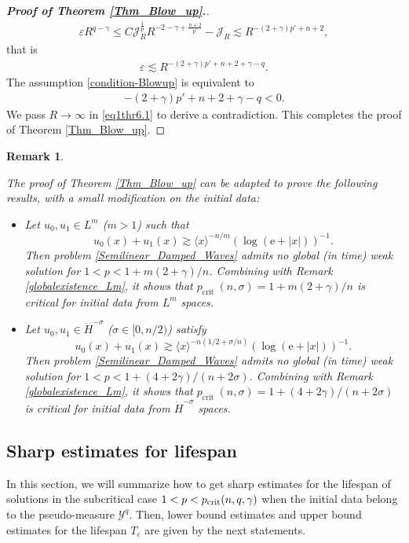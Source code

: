\documentclass[11pt,reqno]{amsart}
\newtheorem{remark}{Remark}[section]
\begin{document}
\begin{proof}[\textbf{Proof of Theorem \ref{Thm_Blow_up}.}]
\begin{align*}
\varepsilon R^{q-\gamma} \leq C\mathcal{J}_R^{\frac{1}{p}}R^{-2-\gamma+\frac{n+2}{p'}} -\mathcal{J}_R \lesssim R^{-(2+\gamma)p'+n+2},
\end{align*}
that is 
\begin{align}
\varepsilon \lesssim R^{-(2+\gamma)p'+n+2+\gamma-q}. \label{eq1thr6.1}
\end{align}
The assumption \eqref{condition-Blowup} is equivalent to
\begin{align*}
-(2+\gamma)p'+n+2+\gamma-q < 0.
\end{align*}
We pass $R \to \infty$ in \eqref{eq1thr6.1} to derive a contradiction. This completes the proof of Theorem \ref{Thm_Blow_up}.
\end{proof}
\begin{remark}\label{blow_up_in_Lm}
{\rm
The proof of Theorem \ref{Thm_Blow_up} can be adapted to prove the following results, with a small modification on the initial data:
\begin{itemize}
    \item Let $u_0,u_1\in L^m$ ($m > 1$) such that 
    \[
    u_0(x)+u_1(x) \gtrsim \langle x\rangle^{-n/m}(\log(\mathrm{e}+|x|))^{-1}.
    \]
    Then problem \eqref{Semilinear_Damped_Waves} admits no global (in time) weak solution for $1<p<1+m(2+\gamma)/n$. Combining with Remark \ref{globalexistence_Lm}, it shows that $p_{\text {crit }}(n, \sigma)=1+m(2+\gamma)/n$ is critical for initial data from $L^m$ spaces.
    \item Let $u_0,u_1\in \dot{H}^{-\sigma}$ ($\sigma\in [0,n/2)$) satisfy 
    \[
    u_0(x)+u_1(x)\gtrsim \langle x\rangle^{-n\left(1/2+\sigma/n\right)}(\log (\mathrm{e}+|x|))^{-1}.
    \]
    Then problem \eqref{Semilinear_Damped_Waves} admits no global (in time) weak solution for $1<p<1+(4+2\gamma)/(n+2\sigma)$. Combining with Remark \ref{globalexistence_Lm}, it shows that $p_{\text {crit }}(n, \sigma)=1+(4+2\gamma)/(n+2\sigma)$ is critical for initial data from $\dot{H}^{-\sigma}$ spaces.
\end{itemize}

}
\end{remark}
\subsection{Sharp estimates for lifespan}

In this section, we will summarize how to get sharp estimates for the lifespan of solutions in the subcritical case  $1 < p < p_{\rm crit}(n,q, \gamma)$ when the initial data belong to the pseudo-measure $\mathcal{Y}^q$. Then, lower bound estimates and upper bound estimates
for the lifespan $T_\varepsilon$ are given by the next statements.
\end{document}
